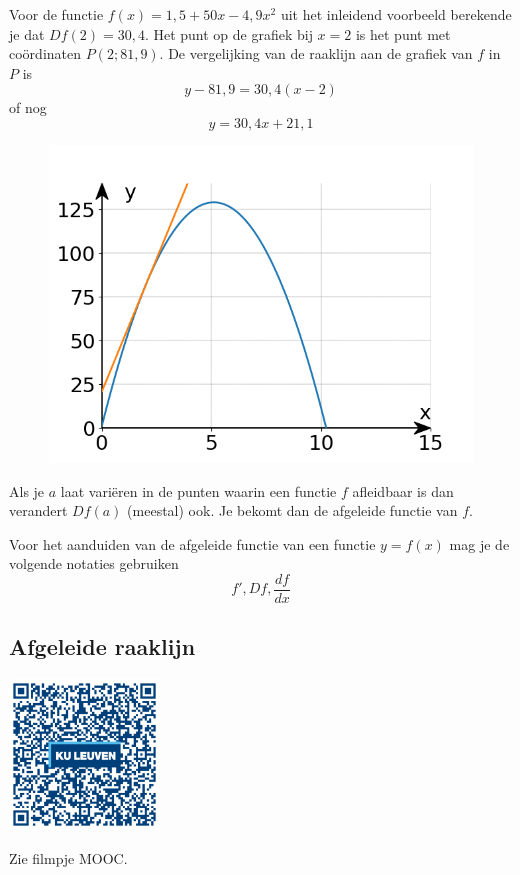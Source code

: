 \begin{voorbeeld}
	Voor de functie $f(x)=1,5+50 x -4,9 x^2$ uit het inleidend voorbeeld berekende je dat $Df(2)=30,4$.
	Het punt op de grafiek bij $x=2$ is het punt met co\"ordinaten $P(2;81,9)$.
	De vergelijking van de raaklijn aan de grafiek van $f$ in $P$ is
	\[
	y-81,9=30,4(x-2)
	\]
	of nog
	\[
	y=30,4x+21,1
	\]
	
	\begin{figure}[h]
		\begin{center}
			\includegraphics[height=5 cm]{6_afgeleiden_integralen/inputs/1_2_vb3}
		\end{center}
	\end{figure}
\end{voorbeeld}\vspace{0,5 cm}

\begin{definitie}
	Als je $a$ laat vari\"eren in de punten waarin een functie $f$ afleidbaar is dan verandert $Df(a)$ (meestal) ook.
	Je bekomt dan de afgeleide functie van $f$.
\end{definitie}

\begin{notatie}
Voor het aanduiden van de afgeleide functie van een functie $y=f(x)$ mag je de volgende notaties gebruiken
\[f',Df,\frac{df}{dx}\]
\end{notatie}

\subsection{Afgeleide raaklijn}

\begin{minipage}{.25\linewidth}
	\raggedright
	\includegraphics[width=4cm]{6_afgeleiden_integralen/inputs/QR_Code_AFGRAAKLIJN_module6new}
\end{minipage}
\begin{minipage}{.7\linewidth}
	Zie filmpje MOOC.
\end{minipage}

